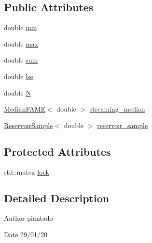 \subsection*{Public Attributes}
\begin{DoxyCompactItemize}
\item 
double \hyperlink{class_fleet_1_1_statistics_1_1_streaming_statistics_a780941dece7b39cc2feaf7ad95da1ae3}{min}
\item 
double \hyperlink{class_fleet_1_1_statistics_1_1_streaming_statistics_a39d330cb8b112aa23d5460011c161f54}{max}
\item 
double \hyperlink{class_fleet_1_1_statistics_1_1_streaming_statistics_ab635c93398bfd1cc8c0c65b012d87d83}{sum}
\item 
double \hyperlink{class_fleet_1_1_statistics_1_1_streaming_statistics_a4ffa58fb5fd8ce43f06bb8bf56115bd5}{lse}
\item 
double \hyperlink{class_fleet_1_1_statistics_1_1_streaming_statistics_a0ef0c93930850d2f177dca7507fc1831}{N}
\item 
\hyperlink{class_fleet_1_1_statistics_1_1_median_f_a_m_e}{Median\+F\+A\+ME}$<$ double $>$ \hyperlink{class_fleet_1_1_statistics_1_1_streaming_statistics_af01ce0d7840f68c8ea68f858ba6760ce}{streaming\+\_\+median}
\item 
\hyperlink{class_fleet_1_1_statistics_1_1_reservoir_sample}{Reservoir\+Sample}$<$ double $>$ \hyperlink{class_fleet_1_1_statistics_1_1_streaming_statistics_adb520be6722da7da835ac097a5602278}{reservoir\+\_\+sample}
\end{DoxyCompactItemize}
\subsection*{Protected Attributes}
\begin{DoxyCompactItemize}
\item 
std\+::mutex \hyperlink{class_fleet_1_1_statistics_1_1_streaming_statistics_a5651ed8dd36b6586ac64aeb8870d3760}{lock}
\end{DoxyCompactItemize}


\subsection{Detailed Description}
\begin{DoxyAuthor}{Author}
piantado 
\end{DoxyAuthor}
\begin{DoxyDate}{Date}
29/01/20 
\end{DoxyDate}


